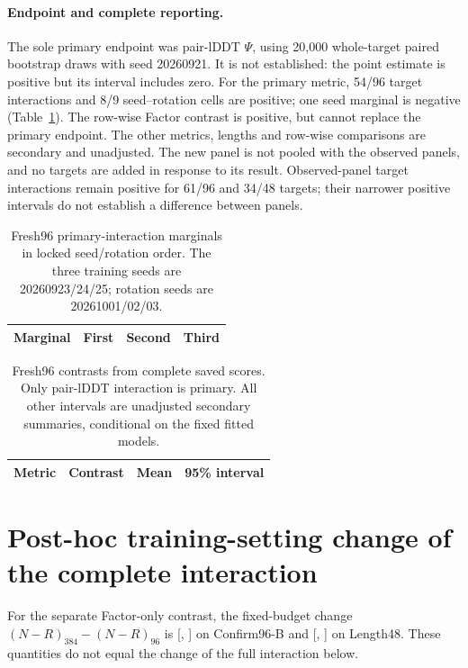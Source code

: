 \paragraph{Endpoint and complete reporting.}
The sole primary endpoint was pair-lDDT $\Psi$, using 20,000 whole-target
paired bootstrap draws with seed 20260921. It is not established: the point
estimate is positive but its interval includes zero. For the primary metric,
54/96 target interactions and 8/9 seed--rotation cells are positive; one seed
marginal is negative (Table~\ref{tab:fresh_marginals}). The row-wise Factor
contrast is positive, but cannot replace the primary endpoint. The other
metrics, lengths and row-wise comparisons are secondary and unadjusted.
The new panel is not pooled with the observed panels, and no targets are added
in response to its result. Observed-panel target interactions remain positive
for 61/96 and 34/48 targets; their narrower positive intervals do not establish
a difference between panels.

\begin{table}[htbp]
\caption{Fresh96 primary-interaction marginals in locked seed/rotation order.
The three training seeds are 20260923/24/25; rotation seeds are 20261001/02/03.}
\label{tab:fresh_marginals}\centering\small
\begin{tabular}{lrrr}\toprule
Marginal & First & Second & Third \\\midrule

\end{tabular}
\end{table}

\begin{table}[htbp]
\caption{Fresh96 contrasts from complete saved scores. Only pair-lDDT interaction
is primary. All other intervals are unadjusted secondary summaries, conditional
on the fixed fitted models.}
\centering\footnotesize
\begin{tabular}{llll}\toprule
Metric & Contrast & Mean & 95\% interval \\\midrule

\end{tabular}
\end{table}

\clearpage
\section{Post-hoc training-setting change of the complete interaction}
\label{app:training_psi}
For the separate Factor-only contrast, the fixed-budget change
$(N-R)_{384}-(N-R)_{96}$ is 
[, ] on Confirm96-B and
 [, ] on
Length48. These quantities do not equal the change of the full interaction below.

